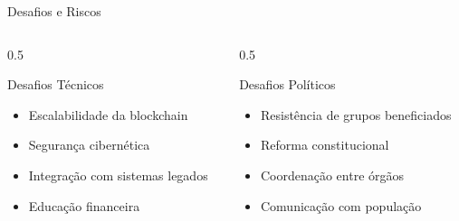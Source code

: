 \documentclass{libs/ufc_format}
\begin{document}
\begin{frame}{Desafios e Riscos}
    \begin{columns}
        \begin{column}{0.5\textwidth}
            \begin{alertblock}{Desafios Técnicos}
                \begin{itemize}
                    \item Escalabilidade da blockchain
                    \item Segurança cibernética
                    \item Integração com sistemas legados
                    \item Educação financeira
                \end{itemize}
            \end{alertblock}
        \end{column}
        \begin{column}{0.5\textwidth}
            \begin{alertblock}{Desafios Políticos}
                \begin{itemize}
                    \item Resistência de grupos beneficiados
                    \item Reforma constitucional
                    \item Coordenação entre órgãos
                    \item Comunicação com população
                \end{itemize}
            \end{alertblock}
        \end{column}
    \end{columns}
    
    \vspace{0.3cm}
    
\end{frame}
\end{document}
